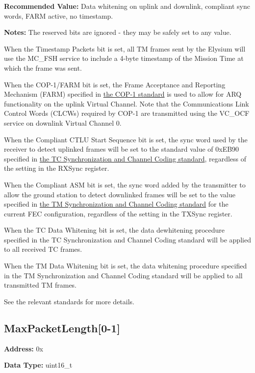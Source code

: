 \documentclass{hitec}
\newcounter{regaddr}
\newcounter{regsize}
\newcommand*{\elyregaddr}[1][1]{0x\padzeroes[2]\Hexadecimal{regaddr}\addtocounter{regaddr}{#1}\setcounter{regsize}{#1}}
\begin{document}
\noindent \textbf{Recommended Value:} Data whitening on uplink and downlink,
compliant sync words, FARM active, no timestamp.

\noindent \textbf{Notes:} The reserved bits are ignored - they may be safely
set to any value.

When the Timestamp Packets bit is set, all TM frames sent by the Elysium will
use the MC\_FSH service to include a 4-byte timestamp of the Mission Time at
which the frame was sent.

When the COP-1/FARM bit is set, the Frame Acceptance and Reporting Mechanism
(FARM) specified in \href{https://public.ccsds.org/Pubs/232x1b2.pdf}{the COP-1
standard} is used to allow for ARQ functionality on the uplink Virtual Channel.
Note that the Communications Link Control Words (CLCWs) required by COP-1 are
transmitted using the VC\_OCF service on downlink Virtual Channel 0.

When the Compliant CTLU Start Sequence bit is set, the sync word used by the
receiver to detect uplinked frames will be set to the standard value of 0xEB90
specified in \href{https://public.ccsds.org/Pubs/231x0b2c1.pdf}{the TC
Synchronization and Channel Coding standard}, regardless of the setting in
the RXSync register.

When the Compliant ASM bit is set, the sync word added by the transmitter to
allow the ground station to detect downlinked frames will be set to the
value specified in \href{https://public.ccsds.org/Pubs/131x0b2ec1.pdf}{the TM
Synchronization and Channel Coding standard} for the current FEC configuration,
regardless of the setting in the TXSync register.

When the TC Data Whitening bit is set, the data dewhitening procedure specified
in the TC Synchronization and Channel Coding standard will be applied to all
received TC frames.

When the TM Data Whitening bit is set, the data whitening procedure specified
in the TM Synchronization and Channel Coding standard will be applied to all
transmitted TM frames.

See the relevant standards for more details.

\subsection{MaxPacketLength[0-1]}

\noindent \textbf{Address:} \elyregaddr[2]

\noindent \textbf{Data Type:} uint16\_t
\end{document}
